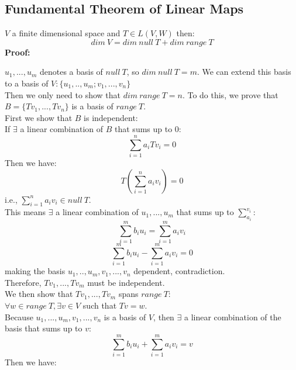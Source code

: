 \documentclass{article}
\begin{document}
\subsection{Fundamental Theorem of Linear Maps}
$V$ a finite dimensional space and $T \in L(V,W)$ then:
\begin{equation*}
    dim\ V = dim\ null\ T + dim\ range\ T
\end{equation*}
\textbf{Proof:}
\begin{addmargin}[1em]{0em}
$u_1, ..., u_m$ denotes a basis of $null\ T$, so $dim\ null\ T = m$. We can extend this basis to a basis of $V:\{u_1, .., u_m; v_1, ..., v_n\}$\\
Then we only need to show that $dim\ range\ T=n$. To do this, we prove that $B = \{Tv_1, ..., Tv_n\}$ is a basis of $range\ T$.\\
First we show that $B$ is independent:\\
If $\exists$ a linear combination of $B$ that sums up to $0$:
\begin{equation*}
    \sum_{i=1}^{n}a_i Tv_i = 0
\end{equation*}
Then we have:
\begin{equation*}
    T\left(\sum_{i=1}^{n} a_i v_i\right) = 0
\end{equation*}
i.e., $\sum_{i=1}^{n} a_i v_i \in null\ T$.\\
This means $\exists$ a linear combination of $u_1, ..., u_m$ that sums up to $\sum_{a_i}^{v_i}$:
\begin{equation*}
    \sum_{i=1}^{m} b_i u_i = \sum_{i=1}^{m} a_i v_i
\end{equation*}
\begin{equation*}
    \sum_{i=1}^{m} b_i u_i - \sum_{i=1}^{m} a_i v_i = 0
\end{equation*}
making the basis $u_1, .., u_m, v_1, ..., v_n$ dependent, contradiction.\\
Therefore, $Tv_1, ..., Tv_m$ must be independent.\\
We then show that $Tv_1, ..., Tv_m$ spans $range\ T$:\\
$\forall w \in range\ T, \exists v \in V$ such that $Tv = w$.\\
Because $u_1, ..., u_m, v_1, ..., v_n$ is a basis of $V$, then $\exists$ a linear combination of the basis that sums up to $v$:
\begin{equation*}
    \sum_{i=1}^{m} b_i u_i + \sum_{i=1}^{m} a_i v_i = v
\end{equation*}
Then we have:
\begin{equation*}

\end{equation*}
\end{addmargin}
\end{document}

